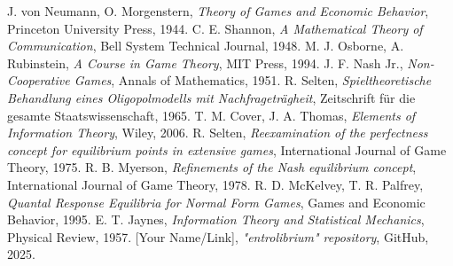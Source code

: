 \documentclass{article}
\begin{document}
\begin{thebibliography}{9}
 J. von Neumann, O. Morgenstern, \emph{Theory of Games and Economic Behavior}, Princeton University Press, 1944.
 C. E. Shannon, \emph{A Mathematical Theory of Communication}, Bell System Technical Journal, 1948. %
 M. J. Osborne, A. Rubinstein, \emph{A Course in Game Theory}, MIT Press, 1994.
 J. F. Nash Jr., \emph{Non-Cooperative Games}, Annals of Mathematics, 1951.
 R. Selten, \emph{Spieltheoretische Behandlung eines Oligopolmodells mit Nachfrageträgheit}, Zeitschrift für die gesamte Staatswissenschaft, 1965.
 T. M. Cover, J. A. Thomas, \emph{Elements of Information Theory}, Wiley, 2006.
 R. Selten, \emph{Reexamination of the perfectness concept for equilibrium points in extensive games}, International Journal of Game Theory, 1975.
 R. B. Myerson, \emph{Refinements of the Nash equilibrium concept}, International Journal of Game Theory, 1978.
 R. D. McKelvey, T. R. Palfrey, \emph{Quantal Response Equilibria for Normal Form Games}, Games and Economic Behavior, 1995.
 E. T. Jaynes, \emph{Information Theory and Statistical Mechanics}, Physical Review, 1957.
 [Your Name/Link], \emph{"entrolibrium" repository}, GitHub, 2025. %
\end{thebibliography}


\end{document}

